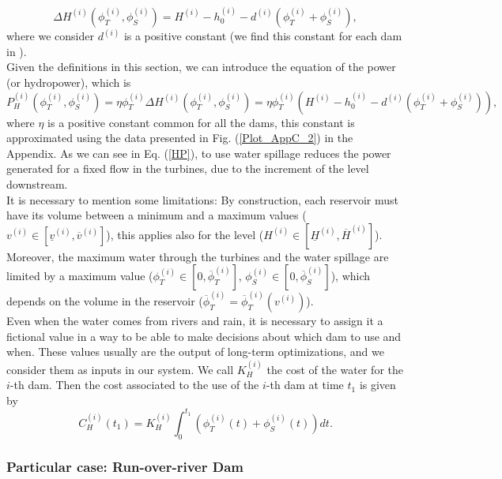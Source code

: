 \begin{equation*}
\Delta H^{(i)}\left(\phi_T^{(i)},\phi_S^{(i)}\right)=H^{(i)}-h_0^{(i)}-d^{(i)}\left(\phi_T^{(i)}+\phi_S^{(i)}\right),
\end{equation*}
where we consider $d^{(i)}$ is a positive constant (we find this constant for each dam in \cite{ADME}).\\
Given the definitions in this section, we can introduce the equation of the power (or hydropower), which is
\begin{equation}
P_H^{(i)}\left(\phi_T^{(i)},\phi_S^{(i)}\right)=\eta\phi_T^{(i)}\Delta H^{(i)}\left(\phi_T^{(i)},\phi_S^{(i)}\right)=\eta\phi_T^{(i)}\left(H^{(i)}-h_0^{(i)}-d^{(i)}\left(\phi_T^{(i)}+\phi_S^{(i)}\right)\right),
\label{HP}
\end{equation}
where $\eta$ is a positive constant common for all the dams, this constant is approximated using the data presented in Fig. (\ref{Plot_AppC_2}) in the Appendix. As we can see in Eq. (\ref{HP}), to use water spillage reduces the power generated for a fixed flow in the turbines, due to the increment of the level downstream.\\
It is necessary to mention some limitations: By construction, each reservoir must have its volume between a minimum and a maximum values ($v^{(i)}\in[\underline{v}^{(i)},\overline{v}^{(i)}]$), this applies also for the level ($H^{(i)}\in\left[\underline{H}^{(i)},\overline{H}^{(i)}\right]$). Moreover, the maximum water through the turbines and the water spillage are limited by a maximum value ($\phi_T^{(i)}\in\left[0,\overline{\phi}_T^{(i)}\right]$, $\phi_S^{(i)}\in\left[0,\overline{\phi}_S^{(i)}\right]$), which depends on the volume in the reservoir ($\overline{\phi}_T^{(i)}=\overline{\phi}_T^{(i)}(v^{(i)})$).\\
Even when the water comes from rivers and rain, it is necessary to assign it a fictional value in a way to be able to make decisions about which dam to use and when. These values usually are the output of long-term optimizations, and we consider them as inputs in our system. We call $K^{(i)}_H$ the cost of the water for the $i$-th dam. Then the cost associated to the use of the $i$-th dam at time $t_1$ is given by
\begin{equation}
C_H^{(i)}(t_1)=K^{(i)}_H\int_0^{t_1}\left(\phi_T^{(i)}(t)+\phi_S^{(i)}(t)\right)dt.
\label{Water_Cost_Function}
\end{equation}

\subsubsection{Particular case: Run-over-river Dam} \label{ROR_Dam}


